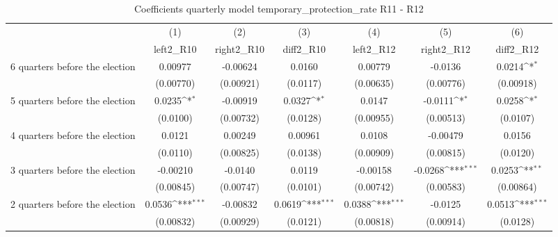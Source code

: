 \begin{table}[htbp]\centering
\def\sym#1{\ifmmode^{#1}\else\(^{#1}\)\fi}
\caption{Coefficients quarterly model temporary\_protection\_rate R11 - R12}
\begin{tabular}{l*{6}{c}}
\hline\hline
                    &\multicolumn{1}{c}{(1)}&\multicolumn{1}{c}{(2)}&\multicolumn{1}{c}{(3)}&\multicolumn{1}{c}{(4)}&\multicolumn{1}{c}{(5)}&\multicolumn{1}{c}{(6)}\\
                    &\multicolumn{1}{c}{left2\_R10}&\multicolumn{1}{c}{right2\_R10}&\multicolumn{1}{c}{diff2\_R10}&\multicolumn{1}{c}{left2\_R12}&\multicolumn{1}{c}{right2\_R12}&\multicolumn{1}{c}{diff2\_R12}\\
\hline
 6 quarters before the election&     0.00977         &    -0.00624         &      0.0160         &     0.00779         &     -0.0136         &      0.0214\sym{*}  \\
                    &   (0.00770)         &   (0.00921)         &    (0.0117)         &   (0.00635)         &   (0.00776)         &   (0.00918)         \\
[1em]
 5 quarters before the election&      0.0235\sym{*}  &    -0.00919         &      0.0327\sym{*}  &      0.0147         &     -0.0111\sym{*}  &      0.0258\sym{*}  \\
                    &    (0.0100)         &   (0.00732)         &    (0.0128)         &   (0.00955)         &   (0.00513)         &    (0.0107)         \\
[1em]
 4 quarters before the election&      0.0121         &     0.00249         &     0.00961         &      0.0108         &    -0.00479         &      0.0156         \\
                    &    (0.0110)         &   (0.00825)         &    (0.0138)         &   (0.00909)         &   (0.00815)         &    (0.0120)         \\
[1em]
 3 quarters before the election&    -0.00210         &     -0.0140         &      0.0119         &    -0.00158         &     -0.0268\sym{***}&      0.0253\sym{**} \\
                    &   (0.00845)         &   (0.00747)         &    (0.0101)         &   (0.00742)         &   (0.00583)         &   (0.00864)         \\
[1em]
 2 quarters before the election&      0.0536\sym{***}&    -0.00832         &      0.0619\sym{***}&      0.0388\sym{***}&     -0.0125         &      0.0513\sym{***}\\
                    &   (0.00832)         &   (0.00929)         &    (0.0121)         &   (0.00818)         &   (0.00914)         &    (0.0128)         \\

\end{tabular}
\end{table}
